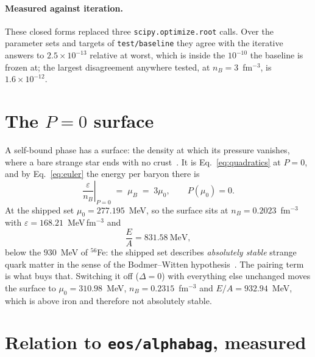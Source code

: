 \documentclass[aps,prc,onecolumn,superscriptaddress,nofootinbib,10pt]{revtex4-2}
\newcommand{\nB}{n_B}
\newcommand{\muB}{\mu_B}
\begin{document}
\paragraph{Measured against iteration.} These closed forms replaced three
\texttt{scipy.optimize.root} calls. Over the parameter sets and targets of
\texttt{test/baseline} they agree with the iterative answers to
$2.5\times10^{-13}$ relative at worst, which is inside the $10^{-10}$ the
baseline is frozen at; the largest disagreement anywhere tested, at
$\nB = 3$~fm$^{-3}$, is $1.6\times10^{-12}$.

\section{The $P = 0$ surface}
\label{sec:surface}

A self-bound phase has a surface: the density at which its pressure vanishes,
where a bare strange star ends with no crust~\cite{Witten1984}. It is
Eq.~\eqref{eq:quadratics} at $P = 0$, and by Eq.~\eqref{eq:euler} the energy
per baryon there is
%
\begin{equation}
\left.\frac{\varepsilon}{\nB}\right|_{P=0} \;=\; \muB \;=\; 3\mu_0 ,
\qquad P(\mu_0) = 0 .
\label{eq:EA}
\end{equation}
%
At the shipped set $\mu_0 = 277.195$~MeV, so the surface sits at
$\nB = 0.2023$~fm$^{-3}$ with $\varepsilon = 168.21$~MeV\,fm$^{-3}$ and
%
\begin{equation}
\frac{E}{A} = 831.58\ \mathrm{MeV} ,
\nonumber
\end{equation}
%
below the $930$~MeV of $^{56}$Fe: the shipped set describes \emph{absolutely
stable} strange quark matter in the sense of the Bodmer--Witten
hypothesis~\cite{Witten1984}. The pairing term is what buys that. Switching it
off ($\Delta = 0$) with everything else unchanged moves the surface to
$\mu_0 = 310.98$~MeV, $\nB = 0.2315$~fm$^{-3}$ and $E/A = 932.94$~MeV, which
is above iron and therefore not absolutely stable.

\section{Relation to \texttt{eos/alphabag}, measured}
\label{sec:xcheck}
\end{document}
